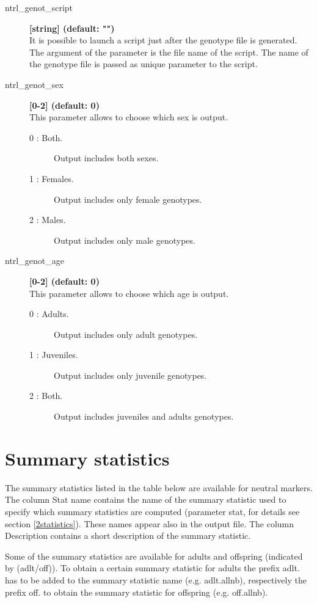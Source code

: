 \documentclass[letterpaper,12pt,oneside]{book}
\begin{document}
\begin{description}
\item[ntrl\_genot\_script] \textbf{[string] (default: "")}\\
It is possible to launch a script just after the genotype file is generated. The argument of the parameter is the file name of the script. The name of the genotype file is passed as unique parameter to the script. 

\item[ntrl\_genot\_sex] \textbf{[0-2] (default: 0)}\\
This parameter allows to choose which sex is output. 
\begin{description}
\item [0 : Both.] Output includes both sexes.
\item [1 : Females.] Output includes only female genotypes.
\item [2 : Males.] Output includes only male genotypes.
\end{description}

\item[ntrl\_genot\_age] \textbf{[0-2] (default: 0)}\\
This parameter allows to choose which age is output.  
\begin{description}
\item [0 : Adults.] Output includes only adult genotypes.
\item [1 : Juveniles.] Output includes only juvenile genotypes.
\item [2 : Both.] Output includes juveniles and adults genotypes.
\end{description}
\end{description}


\section{Summary statistics}\label{ssNTRL}
The summary statistics listed in the table below are available for neutral markers. The column \textsf{Stat name} contains the name of the summary statistic used to specify which summary statistics are computed (parameter \textsf{stat}, for details see section \ref{2statistics}). These names appear also in the output file. The column \textsf{Description} contains a short description of the summary statistic. 

Some of the summary statistics are available for adults and offspring (indicated by \textsf{(adlt/off)}). To obtain a certain summary statistic for adults the prefix \textsf{adlt.} has to be added to the summary statistic name (e.g. \textsf{adlt.allnb}), respectively the prefix \textsf{off.} to obtain the summary statistic for offspring (e.g. \textsf{off.allnb}). 
\end{document}
